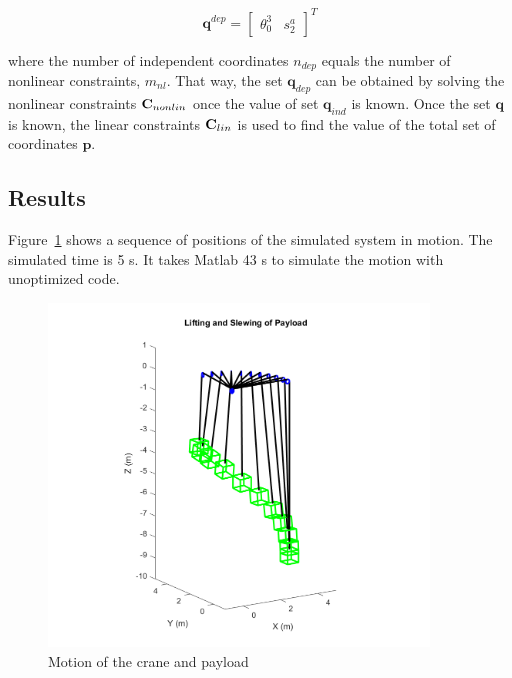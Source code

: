 \begin{equation} 
{{\mathbf{q}}^{dep}} = {\left[ {\begin{array}{*{20}{c}}
{{\theta_{0}^{3}}}&{s_2^a}
\end{array}} \right]^T}
\label{Dep}
\end{equation}

where the number of independent coordinates $n_{dep}$ equals the number of nonlinear constraints, $m_{nl}$. That way, the set $\textbf{q}_{dep}$ can be obtained by solving the nonlinear constraints ${\bf{C}}_{nonlin}$ once the value of set $\textbf{q}_{ind}$ is known. Once the set $\textbf{q}$ is known, the linear constraints ${\bf{C}}_{lin}$ is used to find the value of the total set of coordinates $\textbf{p}$.

\subsection{Results}

Figure~\ref{fig:craneLiftingSlewing} shows a sequence of positions of the simulated system in motion. The simulated time is 5 s. It takes Matlab 43 s to simulate the motion with unoptimized code.

\begin{figure}
    \centering
    \includegraphics[width=0.9\textwidth]{Figures/craneLiftingSlewing.png}
    \caption{Motion of the crane and payload}
    \label{fig:craneLiftingSlewing}
\end{figure}








